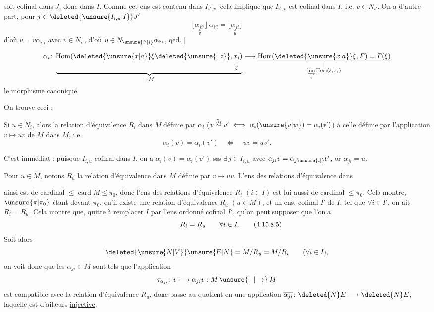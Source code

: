 
soit cofinal dans $J$, donc dans $I$. Comme cet ens  est contenu dans $I_{i',v}$, cela implique que $I_{i',v}$ est cofinal dans $I$, i.e. $v\in N_{i'}$. On a d'autre part, pour $j\in\deleted{\unsure{I_{i,u}|I}}J'$
\[
\underset{v}{\lfloor\!\underline{\alpha_{ji'}}\!\rfloor}\,\alpha_{i'i}=\underset{u}{\lfloor\!\underline{\alpha_{ji}}\!\rfloor}
\]
d'où $u=v\alpha_{i'i}$ avec $v\in N_{i'}$, d'où $u\in N_{\unsure{i'|i}}\alpha_{i'i}$, qed. $\big]$

 
\[
\alpha_i\colon\underbrace{\mathrm{Hom}(\deleted{\unsure{x|a}}\xi\deleted{\unsure{\,\!,|i}},\underset{\substack{\Vert\\\xi}}{x_i})}_{=M}\longrightarrow
\underset{\substack{\Vert\\\underset{i}{\varinjlim}\,\mathrm{Hom}(\xi,x_i)}}{\underline{\mathrm{Hom}(\deleted{\unsure{x|a}}\xi,F)=F(\xi)}}
\]
le morphisme canonique.

On trouve ceci :

\noindent{}Si $u\in N_i$, alors la relation d'équivalence $R_i$ dans $M$ définie par $\alpha_i$ ($v\overset{R_i}{\sim}v'\iff\alpha_i(\unsure{v|w})=\alpha_i(v')$)   à celle définie par l'application $v\longmapsto uv$ de $M$ dans $M$, i.e.
\[
\alpha_i(v)=\alpha_i(v')\quad\Longleftrightarrow\quad uv=uv'.
\]

C'est immédiat : puisque $I_{i,u}$  cofinal dans $I$,  on a $\alpha_i(v)=\alpha_i(v')$ sss $\exists\, j\in I_{i,u}$ avec $\alpha_{ji}v=\alpha_{j\unsure{i|{}}}v'$, or $\alpha_{ji}=u$.


Pour $u\in M$, notons $R_u$ la relation d'équivalence dans $M$ définie par $v\longmapsto uv$. L'ens des relations d'équivalence dans

 ainsi est de cardinal $\leq\operatorname{card} M\leq\pi_0$, donc l'ens des relations d'équivalence $R_i$ $(i\in I)$ est lui aussi de cardinal $\leq\pi_0$. Cela montre, $\unsure{\pi|\pi_0}$ étant  devant $\pi_0$, qu'il existe une relation d'équivalence  $R_u$ $(u\in M)$, et un ens. cofinal $I'$ de $I$, tel que $\forall i\in I'$, on ait $R_i=R_u$. Cela montre que, quitte
à remplacer $I$ par l'ens ordonné cofinal $I'$, qu'on peut supposer que l'on a
\[
R_i=R_u\qquad\forall i\in I.
\tag*{\makebox[0pt][r]{\makebox[\displaywidth][l]{(4.15.8.5)}}}
\]
Soit alors
\[
\deleted{\unsure{N|V}}\unsure{E|N}=M/R_u=M/R_i\qquad(\forall i\in I),
\]
on voit donc que les $\alpha_{ji}\in M$  sont tels que l'application
\[
\tau_{\alpha_{ji}}\colon v\longmapsto\alpha_{ji}v:M\mathbin{\unsure{-|\to}}M
\]
est compatible avec la relation d'équivalence $R_u$, donc passe au quotient en une
application $\overline{\alpha_{ji}}\colon\deleted{N}E\longrightarrow\deleted{N}E$,  laquelle est d'ailleurs \uline{injective}.

